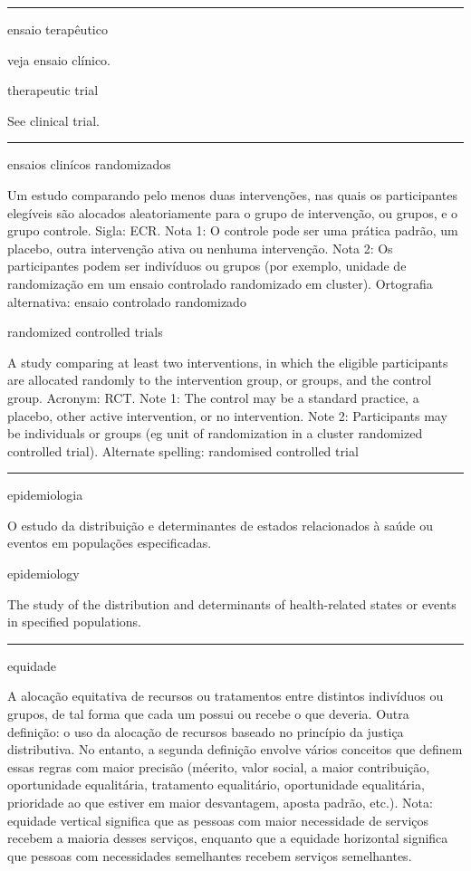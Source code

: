 \documentclass[
]{book}
\begin{document}
\begin{center}\rule{0.5\linewidth}{0.5pt}\end{center}

ensaio terapêutico

veja ensaio clínico.

therapeutic trial

See clinical trial.

\begin{center}\rule{0.5\linewidth}{0.5pt}\end{center}

ensaios clinícos randomizados

Um estudo comparando pelo menos duas intervenções, nas quais os participantes elegíveis são alocados aleatoriamente para o grupo de intervenção, ou grupos, e o grupo controle. Sigla: ECR. Nota 1: O controle pode ser uma prática padrão, um placebo, outra intervenção ativa ou nenhuma intervenção. Nota 2: Os participantes podem ser indivíduos ou grupos (por exemplo, unidade de randomização em um ensaio controlado randomizado em cluster). Ortografia alternativa: ensaio controlado randomizado

randomized controlled trials

A study comparing at least two interventions, in which the eligible participants are allocated randomly to the intervention group, or groups, and the control group. Acronym: RCT. Note 1: The control may be a standard practice, a placebo, other active intervention, or no intervention. Note 2: Participants may be individuals or groups (eg unit of randomization in a cluster randomized controlled trial). Alternate spelling: randomised controlled trial

\begin{center}\rule{0.5\linewidth}{0.5pt}\end{center}

epidemiologia

O estudo da distribuição e determinantes de estados relacionados à saúde ou eventos em populações especificadas.

epidemiology

The study of the distribution and determinants of health-related states or events in specified populations.

\begin{center}\rule{0.5\linewidth}{0.5pt}\end{center}

equidade

A alocação equitativa de recursos ou tratamentos entre distintos indivíduos ou grupos, de tal forma que cada um possui ou recebe o que deveria. Outra definição: o uso da alocação de recursos baseado no princípio da justiça distributiva. No entanto, a segunda definição envolve vários conceitos que definem essas regras com maior precisão (méerito, valor social, a maior contribuição, oportunidade equalitária, tratamento equalitário, oportunidade equalitária, prioridade ao que estiver em maior desvantagem, aposta padrão, etc.). Nota: equidade vertical significa que as pessoas com maior necessidade de serviços recebem a maioria desses serviços, enquanto que a equidade horizontal significa que pessoas com necessidades semelhantes recebem serviços semelhantes.
\end{document}
